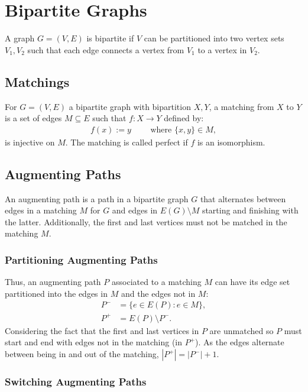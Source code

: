 \section{Bipartite Graphs}

A graph $G = (V, E)$ is bipartite if $V$ can be partitioned into
two vertex sets $V_1, V_2$ such that each edge connects a vertex
from $V_1$ to a vertex in $V_2$.

\subsection{Matchings}

For $G = (V, E)$ a bipartite graph with bipartition $X, Y$,
a matching from $X$ to $Y$ is a set of edges $M \subseteq E$
such that $f : X \to Y$ defined by: \begin{gather*}
  f(x) := y \qquad \text{ where } \{x, y\} \in M,
\end{gather*} is injective on $M$. The matching is called perfect
if $f$ is an isomorphism.

\subsection{Augmenting Paths}

An augmenting path is a path in a bipartite graph $G$ that alternates between
edges in a matching $M$ for $G$ and edges in $E(G) \setminus M$ starting
and finishing with the latter. Additionally, the first and last vertices 
must not be matched in the matching $M$.

\subsubsection{Partitioning Augmenting Paths}

Thus, an augmenting path $P$ associated to a matching $M$ can
have its edge set partitioned into the edges in $M$ and the
edges not in $M$: \begin{align*}
  P^- &= \{e \in E(P) : e \in M\}, \\
  P^+ &= E(P) \setminus P^-.
\end{align*} Considering the fact that the first and
last vertices in $P$ are unmatched so $P$ must start and end with
edges not in the matching (in $P^+$). 
As the edges alternate between being in and out of the matching, 
$|P^+| = |P^-| + 1$.

\subsubsection{Switching Augmenting Paths}

